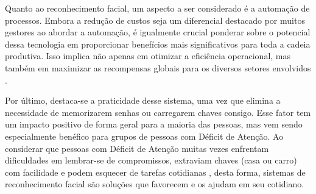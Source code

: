 Quanto ao reconhecimento facial, um aspecto a ser considerado é a automação 
de processos. Embora a redução de custos seja um diferencial destacado 
por muitos gestores ao abordar a automação, é igualmente crucial ponderar 
sobre o potencial dessa tecnologia em proporcionar benefícios mais 
significativos para toda a cadeia produtiva. Isso implica não apenas em 
otimizar a eficiência operacional, mas também em maximizar as 
recompensas globais para os diversos setores envolvidos \cite{tiinside2023}.

Por último, destaca-se a praticidade desse sistema, uma vez que 
elimina a necessidade de memorizarem senhas ou carregarem 
chaves consigo. Esse fator tem um impacto positivo de forma geral para 
a maioria das pessoas, mas vem sendo especialmente benéfico 
para grupos de pessoas com Déficit de Atenção. 
Ao considerar que pessoas com Déficit de Atenção muitas vezes enfrentam dificuldades 
em lembrar-se de compromissos, extraviam chaves (casa ou carro) com facilidade e podem 
esquecer de tarefas cotidianas \cite{abda2023}, desta forma, sistemas de reconhecimento 
facial são soluções que favorecem e os ajudam em seu cotidiano.
